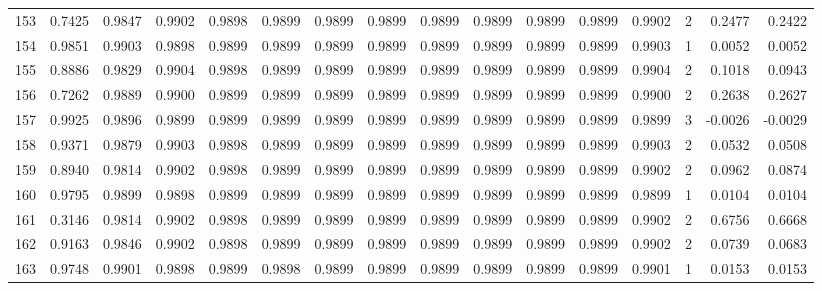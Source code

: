 \begin{tabular}{lrrrrrrrrrrrrrrr}
153 &      0.7425 &  0.9847 &  0.9902 &  0.9898 &  0.9899 &  0.9899 &  0.9899 &  0.9899 &  0.9899 &  0.9899 &   0.9899 &     0.9902 &      2 &                    0.2477 &                     0.2422 \\
154 &      0.9851 &  0.9903 &  0.9898 &  0.9899 &  0.9899 &  0.9899 &  0.9899 &  0.9899 &  0.9899 &  0.9899 &   0.9899 &     0.9903 &      1 &                    0.0052 &                     0.0052 \\
155 &      0.8886 &  0.9829 &  0.9904 &  0.9898 &  0.9899 &  0.9899 &  0.9899 &  0.9899 &  0.9899 &  0.9899 &   0.9899 &     0.9904 &      2 &                    0.1018 &                     0.0943 \\
156 &      0.7262 &  0.9889 &  0.9900 &  0.9899 &  0.9899 &  0.9899 &  0.9899 &  0.9899 &  0.9899 &  0.9899 &   0.9899 &     0.9900 &      2 &                    0.2638 &                     0.2627 \\
157 &      0.9925 &  0.9896 &  0.9899 &  0.9899 &  0.9899 &  0.9899 &  0.9899 &  0.9899 &  0.9899 &  0.9899 &   0.9899 &     0.9899 &      3 &                   -0.0026 &                    -0.0029 \\
158 &      0.9371 &  0.9879 &  0.9903 &  0.9898 &  0.9899 &  0.9899 &  0.9899 &  0.9899 &  0.9899 &  0.9899 &   0.9899 &     0.9903 &      2 &                    0.0532 &                     0.0508 \\
159 &      0.8940 &  0.9814 &  0.9902 &  0.9898 &  0.9899 &  0.9899 &  0.9899 &  0.9899 &  0.9899 &  0.9899 &   0.9899 &     0.9902 &      2 &                    0.0962 &                     0.0874 \\
160 &      0.9795 &  0.9899 &  0.9898 &  0.9899 &  0.9899 &  0.9899 &  0.9899 &  0.9899 &  0.9899 &  0.9899 &   0.9899 &     0.9899 &      1 &                    0.0104 &                     0.0104 \\
161 &      0.3146 &  0.9814 &  0.9902 &  0.9898 &  0.9899 &  0.9899 &  0.9899 &  0.9899 &  0.9899 &  0.9899 &   0.9899 &     0.9902 &      2 &                    0.6756 &                     0.6668 \\
162 &      0.9163 &  0.9846 &  0.9902 &  0.9898 &  0.9899 &  0.9899 &  0.9899 &  0.9899 &  0.9899 &  0.9899 &   0.9899 &     0.9902 &      2 &                    0.0739 &                     0.0683 \\
163 &      0.9748 &  0.9901 &  0.9898 &  0.9899 &  0.9898 &  0.9899 &  0.9899 &  0.9899 &  0.9899 &  0.9899 &   0.9899 &     0.9901 &      1 &                    0.0153 &                     0.0153 \\

\end{tabular}
